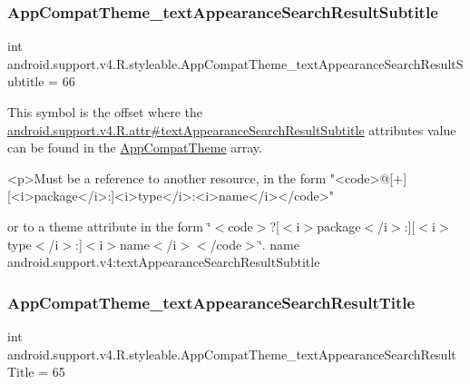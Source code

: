 \subsubsection{\texorpdfstring{App\+Compat\+Theme\+\_\+text\+Appearance\+Search\+Result\+Subtitle}{AppCompatTheme\_textAppearanceSearchResultSubtitle}}
{\footnotesize\ttfamily int android.\+support.\+v4.\+R.\+styleable.\+App\+Compat\+Theme\+\_\+text\+Appearance\+Search\+Result\+Subtitle = 66\hspace{0.3cm}{\ttfamily [static]}}

This symbol is the offset where the \hyperlink{classandroid_1_1support_1_1v4_1_1R_1_1attr_ab65ed23c9eed16cf42d91ea4e8e70946}{android.\+support.\+v4.\+R.\+attr\#text\+Appearance\+Search\+Result\+Subtitle} attribute\textquotesingle{}s value can be found in the \hyperlink{classandroid_1_1support_1_1v4_1_1R_1_1styleable_ac07ebbe62ed977f6dcaadc6397840ace}{App\+Compat\+Theme} array.

\begin{DoxyVerb}      <p>Must be a reference to another resource, in the form "<code>@[+][<i>package</i>:]<i>type</i>:<i>name</i></code>"
\end{DoxyVerb}
 or to a theme attribute in the form \char`\"{}$<$code$>$?\mbox{[}$<$i$>$package$<$/i$>$\+:\mbox{]}\mbox{[}$<$i$>$type$<$/i$>$\+:\mbox{]}$<$i$>$name$<$/i$>$$<$/code$>$\char`\"{}.  name android.\+support.\+v4\+:text\+Appearance\+Search\+Result\+Subtitle \mbox{\label{classandroid_1_1support_1_1v4_1_1R_1_1styleable_aa8c47e569f9386614f689cf93446e929}} 
\subsubsection{\texorpdfstring{App\+Compat\+Theme\+\_\+text\+Appearance\+Search\+Result\+Title}{AppCompatTheme\_textAppearanceSearchResultTitle}}
{\footnotesize\ttfamily int android.\+support.\+v4.\+R.\+styleable.\+App\+Compat\+Theme\+\_\+text\+Appearance\+Search\+Result\+Title = 65\hspace{0.3cm}{\ttfamily [static]}}

